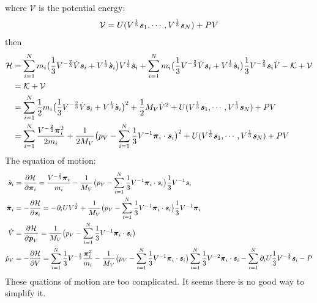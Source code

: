 \documentclass[aps, pre, preprint,unsortedaddress,a4paper,onecolumn]{revtex4}
\newcommand{\vect}[1]{\textbf{\textit{#1}}}
\newcommand{\mypi}{\boldsymbol\pi}
\begin{document}
where $\mathcal V$ is the potential energy:
\begin{align}
  \mathcal V = U(V^{\frac13}\vect s_1, \cdots, V^{\frac13}\vect s_N) + PV
\end{align}
then
\begin{align}\nonumber
  \mathcal H &=
  \sum_{i=1}^N
  m_i \big(\frac13 V^{-\frac23} \dot V \vect s_i + V^{\frac13}\dot{\vect s}_i\big) V^{\frac13}\dot{\vect s}_i
  + 
  \sum_{i=1}^N
  m_i \big(\frac13 V^{-\frac23} \dot V \vect s_i + V^{\frac13}\dot{\vect s}_i\big)
  \frac13 V^{-\frac23}\vect s_i \dot V
  - \mathcal K + \mathcal V \\
  & =
  \mathcal K + \mathcal V \\
  &=
  \sum_{i=1}^N \frac 12 m_i
  \big(\frac13 V^{-\frac23} \dot V \vect s_i + V^{\frac13}\dot{\vect s}_i\big)^2
  +
  \frac 12 {M_V} \dot V^2
  +
  U(V^{\frac13}\vect s_1, \cdots, V^{\frac13}\vect s_N) + PV \\
  &=
  \sum_{i=1}^N\frac{V^{-\frac23} \mypi_i^2}{2m_i}
  +
  \frac1{2{M_V}}\big(p_V - \sum_{i=1}^N\frac13V^{-1} \mypi_i\cdot\vect s_i\big)^2
  +
  U(V^{\frac13}\vect s_1, \cdots, V^{\frac13}\vect s_N) + PV 
\end{align}
The equation of motion:
\begin{align}
  \dot{\vect s}_i
  &=
  \frac{\partial \mathcal H}{\partial \mypi_i}
  =
  \frac{V^{-\frac23}\mypi_i}{m_i} -
  \frac1{{M_V}}\big(p_V - \sum_{i=1}^N\frac13V^{-1} \mypi_i\cdot\vect s_i\big)\frac13 V^{-1}\vect s_i \\
  \dot{\mypi}_i
  &= 
  -\frac{\partial \mathcal H}{\partial \vect s_i}
  = -\partial_i U V^{\frac13} +
  \frac1{{M_V}}\big(p_V - \sum_{i=1}^N\frac13V^{-1} \mypi_i\cdot\vect s_i\big)\frac13 V^{-1}\mypi_i \\
  \dot{V} 
  &=
  \frac{\partial \mathcal H}{\partial \vect p_V}
  =\frac1{M_V}\big(p_V - \sum_{i=1}^N\frac13V^{-1} \mypi_i\cdot\vect s_i\big)\\
  \dot{p}_V
  &=
  -\frac{\partial \mathcal H}{\partial V}
  =
  \sum_{i=1}^N \frac13V^{-\frac53} \frac{ \mypi_i^2}{m_i}
  -
  \frac1{{M_V}}\big(p_V - \sum_{i=1}^N\frac13V^{-1} \mypi_i\cdot\vect s_i\big)
  \sum_{i=1}^N\frac13V^{-2} \mypi_i\cdot\vect s_i
  -
  \sum_{i=1}^N\partial_i U \frac13V^{-\frac23}\vect s_i - P
\end{align}
These quations of motion are too complicated.  It seems there is no good way to simplify it.
\end{document}
